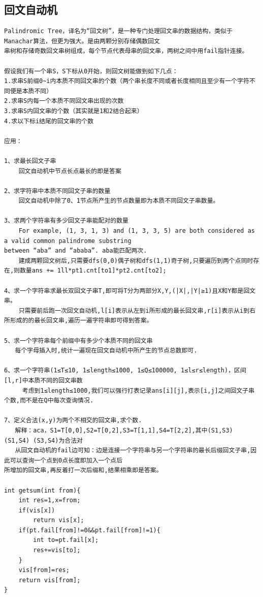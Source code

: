 \documentclass[twoside]{article}
\begin{document}
\subsection{回文自动机}
\begin{lstlisting}
Palindromic Tree，译名为“回文树”，是一种专门处理回文串的数据结构，类似于Manachar算法，但更为强大。是由两颗分别存储偶数回文
串树和存储奇数回文串树组成，每个节点代表母串的回文串，两树之间中用fail指针连接。

假设我们有一个串S，S下标从0开始，则回文树能做到如下几点：
1.求串S前缀0~i内本质不同回文串的个数（两个串长度不同或者长度相同且至少有一个字符不同便是本质不同）
2.求串S内每一个本质不同回文串出现的次数
3.求串S内回文串的个数（其实就是1和2结合起来）
4.求以下标i结尾的回文串的个数

应用：

1、求最长回文子串
    回文自动机中节点长点最长的即是答案

2、求字符串中本质不同回文子串的数量
    回文自动机中除了0、1节点所产生的节点数量即为本质不同回文子串数量。

3、求两个字符串有多少回文子串能配对的数量
    For example, (1, 3, 1, 3) and (1, 3, 3, 5) are both considered as a valid common palindrome substring
between “aba” and “ababa”. aba能匹配两次.
    建成两颗回文树后,只需要dfs(0,0)偶子树和dfs(1,1)奇子树,只要遍历到两个点同时存在,则数量ans += 1ll*pt1.cnt[to1]*pt2.cnt[to2];

4、求一个字符串求最长双回文子串T,即可将T分为两部分X,Y,(|X|,|Y|≥1)且X和Y都是回文串。
    只需要前后跑一次回文自动机,l[i]表示从左到i所形成的最长回文串,r[i]表示从i到右所形成的的最长回文串,遍历一遍字符串即可得到答案。
    
5、求一个字符串每个前缀中有多少个本质不同的回文串
   每个字母插入时,统计一遍现在回文自动机中所产生的节点总数即可.

6、求一个字符串(1≤T≤10, 1≤length≤1000, 1≤Q≤100000, 1≤l≤r≤length)，区间[l,r]中本质不同的回文串数
     考虑到1≤length≤1000,我们可以强行打表记录ans[i][j],表示[i,j]之间回文子串个数,而不是在Q中每次查询情况.

7、定义合法(x,y)为两个不相交的回文串,求个数.
   解释：aca，S1=T[0,0],S2=T[0,2],S3=T[1,1],S4=T[2,2],其中(S1,S3) (S1,S4) (S3,S4)为合法对
   从回文自动机的fail边可知：边是连接一个字符串与另一个字符串的最长后缀回文子串,因此可以查询一个点到0点长度即加入一个点后
所增加的回文串,再反着打一次后缀和,结果相乘即是答案。

int getsum(int from){
    int res=1,x=from;
    if(vis[x])
        return vis[x];
    if(pt.fail[from]!=0&&pt.fail[from]!=1){
        int to=pt.fail[x];
        res+=vis[to];
    }
    vis[from]=res;
    return vis[from];
}


\end{lstlisting}
\end{document}
